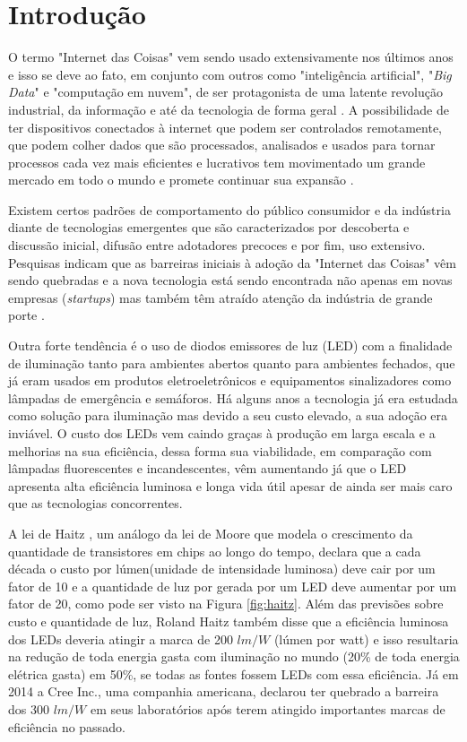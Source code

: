 \chapter{Introdução}

O termo "Internet das Coisas" \space vem sendo usado extensivamente nos últimos anos e isso se deve ao fato, em conjunto com outros como "inteligência artificial", "\textit{Big Data}" \space e "computação em nuvem", de ser protagonista de uma latente revolução industrial, da informação e até da tecnologia de forma geral \cite{iot-future}. A possibilidade de ter dispositivos conectados à internet que podem ser controlados remotamente, que podem colher dados que são processados, analisados e usados para tornar processos cada vez mais eficientes e lucrativos tem movimentado um grande mercado em todo o mundo e promete continuar sua expansão \cite{iot-future}. 

Existem certos padrões de comportamento do público consumidor e da indústria diante de  tecnologias emergentes que são caracterizados por descoberta e discussão inicial, difusão entre adotadores precoces e por fim, uso extensivo. Pesquisas indicam que as barreiras iniciais à adoção da "Internet das Coisas" \space vêm sendo quebradas e a nova tecnologia está sendo encontrada não apenas em novas empresas (\textit{startups}) mas também têm atraído atenção da indústria de grande porte \cite{forbes}. 

Outra forte tendência é o uso de diodos emissores de luz (LED) com a finalidade de iluminação tanto para ambientes abertos quanto para ambientes fechados, que já eram usados em produtos eletroeletrônicos e equipamentos sinalizadores como lâmpadas de emergência e semáforos. Há alguns anos a tecnologia já era estudada como solução para iluminação mas devido a seu custo elevado, a sua adoção era inviável. O custo dos LEDs vem caindo graças à produção em larga escala e a melhorias na sua eficiência, dessa forma sua viabilidade, em comparação com lâmpadas fluorescentes e incandescentes, vêm aumentando já que o LED apresenta alta eficiência luminosa e longa vida útil apesar de ainda ser mais caro que as tecnologias concorrentes.

A lei de Haitz \cite{haitz}, um análogo da lei de Moore que modela o crescimento da quantidade de transistores em chips ao longo do tempo, declara que a cada década o custo por lúmen(unidade de intensidade luminosa) deve cair por um fator de 10 e a quantidade de luz por gerada por um LED deve aumentar por um fator de 20, como pode ser visto na Figura \ref{fig:haitz}. Além das previsões sobre custo e quantidade de luz, Roland Haitz também disse que a eficiência luminosa dos LEDs deveria atingir a marca de 200 $lm/W$ (lúmen por watt) e isso resultaria na redução de toda energia gasta com iluminação no mundo (20\% de toda energia elétrica gasta) em 50\%, se todas as fontes fossem LEDs com essa eficiência. Já em 2014 a Cree Inc., uma companhia americana, declarou ter quebrado a barreira dos 300 $lm/W$ \cite{cree} em seus laboratórios após terem atingido importantes marcas de eficiência no passado.

